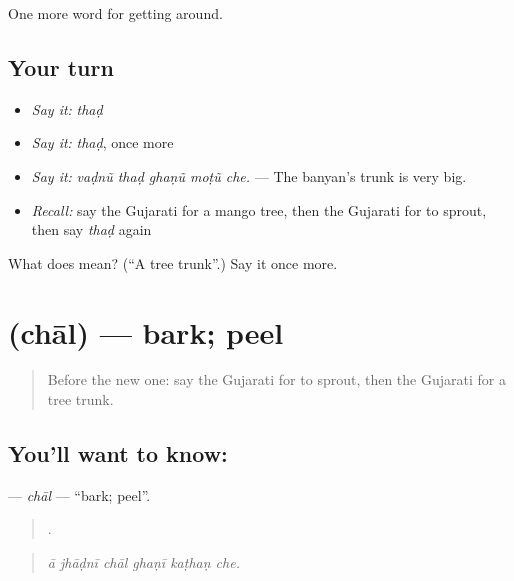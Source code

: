 \begin{grammarlens}[title={What you've built}]
One more word for getting around.
\end{grammarlens}

\subsection*{Your turn}
\begin{itemize}
\raggedright
  \item \emph{Say it:} \emph{thaḍ}
  \item \emph{Say it:} \emph{thaḍ}, once more
  \item \emph{Say it:} \emph{vaḍnũ thaḍ ghaṇũ moṭũ che.} — The banyan's trunk is very big.
  \item \emph{Recall:} say the Gujarati for a mango tree, then the Gujarati for to sprout, then say \emph{thaḍ} again
\end{itemize}

\begin{tcolorbox}[breakable,colback=teal!4,colframe=teal!35!black,title={Before you move on}]
What does  mean? (\textquotedblleft{}A tree trunk\textquotedblright{}.) Say it once more.
\end{tcolorbox}
\section[\texorpdfstring{\gu{છાલ} (chāl)}{છાલ (chāl)}]{ (chāl) — bark; peel}

\label{lesson:GU-C444-chal}



\begin{quote}
Before the new one: say the Gujarati for to sprout, then the Gujarati for a tree trunk.
\end{quote}

\subsection*{You'll want to know: }
\textbf{} — \emph{chāl} — \textquotedblleft{}bark; peel\textquotedblright{}.

\begin{quote}
     .
\end{quote}

\begin{quote}
\emph{ā jhāḍnī chāl ghaṇī kaṭhaṇ che.}
\end{quote}

